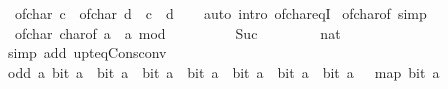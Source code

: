 \begin{isabellebody}
\ \ {\isacartoucheopen}of{\isacharunderscore}{\kern0pt}char\ c\ {\isacharequal}{\kern0pt}\ of{\isacharunderscore}{\kern0pt}char\ d\ {\isasymlongleftrightarrow}\ c\ {\isacharequal}{\kern0pt}\ d{\isacartoucheclose}\isanewline
%
\isadelimproof
\ \ %
\endisadelimproof
%
\isatagproof
{}\isamarkupfalse%
\ {\isacharparenleft}{\kern0pt}auto\ intro{\isacharcolon}{\kern0pt}\ of{\isacharunderscore}{\kern0pt}char{\isacharunderscore}{\kern0pt}eqI{\isacharparenright}{\kern0pt}%
\endisatagproof
{\isafoldproof}%
%
\isadelimproof
\isanewline
%
\endisadelimproof
\isanewline
{}\isamarkupfalse%
\ of{\isacharunderscore}{\kern0pt}char{\isacharunderscore}{\kern0pt}of\ {\isacharbrackleft}{\kern0pt}simp{\isacharbrackright}{\kern0pt}{\isacharcolon}{\kern0pt}\isanewline
\ \ {\isacartoucheopen}of{\isacharunderscore}{\kern0pt}char\ {\isacharparenleft}{\kern0pt}char{\isacharunderscore}{\kern0pt}of\ a{\isacharparenright}{\kern0pt}\ {\isacharequal}{\kern0pt}\ a\ mod\ {}{}{}{\isacartoucheclose}\isanewline
%
\isadelimproof
%
\endisadelimproof
%
\isatagproof
{}\isamarkupfalse%
\ {\isacharminus}{\kern0pt}\isanewline
\ \ \isamarkupfalse%
\ {\isacartoucheopen}{\isacharbrackleft}{\kern0pt}{}{\isachardot}{\kern0pt}{\isachardot}{\kern0pt}{\isacharless}{\kern0pt}{}{\isacharbrackright}{\kern0pt}\ {\isacharequal}{\kern0pt}\ {\isacharbrackleft}{\kern0pt}{}{\isacharcomma}{\kern0pt}\ Suc\ {}{\isacharcomma}{\kern0pt}\ {}{\isacharcomma}{\kern0pt}\ {}{\isacharcomma}{\kern0pt}\ {}{\isacharcomma}{\kern0pt}\ {}{\isacharcomma}{\kern0pt}\ {}{\isacharcomma}{\kern0pt}\ {}\ {\isacharcolon}{\kern0pt}{\isacharcolon}{\kern0pt}\ nat{\isacharbrackright}{\kern0pt}{\isacartoucheclose}\isanewline
\ \ \ \ \isamarkupfalse%
\ {\isacharparenleft}{\kern0pt}simp\ add{\isacharcolon}{\kern0pt}\ upt{\isacharunderscore}{\kern0pt}eq{\isacharunderscore}{\kern0pt}Cons{\isacharunderscore}{\kern0pt}conv{\isacharparenright}{\kern0pt}\isanewline
\ \ \isamarkupfalse%
\ \isamarkupfalse%
\ {\isacartoucheopen}{\isacharbrackleft}{\kern0pt}odd\ a{\isacharcomma}{\kern0pt}\ bit\ a\ {}{\isacharcomma}{\kern0pt}\ bit\ a\ {}{\isacharcomma}{\kern0pt}\ bit\ a\ {}{\isacharcomma}{\kern0pt}\ bit\ a\ {}{\isacharcomma}{\kern0pt}\ bit\ a\ {}{\isacharcomma}{\kern0pt}\ bit\ a\ {}{\isacharcomma}{\kern0pt}\ bit\ a\ {}{\isacharbrackright}{\kern0pt}\ {\isacharequal}{\kern0pt}\ map\ {\isacharparenleft}{\kern0pt}bit\ a{\isacharparenright}{\kern0pt}\ {\isacharbrackleft}{\kern0pt}{}{\isachardot}{\kern0pt}{\isachardot}{\kern0pt}{\isacharless}{\kern0pt}{}{\isacharbrackright}{\kern0pt}{\isacartoucheclose}\isanewline

\end{isabellebody}
